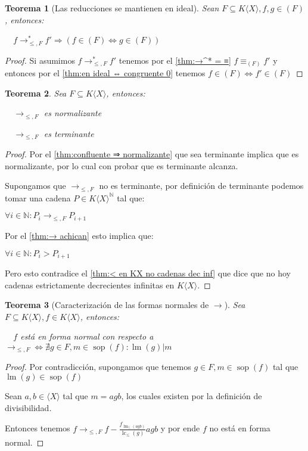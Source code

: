 \documentclass{amsbook}
\theoremstyle{customstyle}
\newtheorem{theorem}{Teorema}[section]
\DeclareMathOperator{\sop}{sop}
\DeclareMathOperator{\lm}{lm}
\DeclareMathOperator{\lc}{lc}
\begin{document}
\begin{theorem}[Las reducciones se mantienen en ideal]\label{thm:→ mantiene pertenencia a ideal}
Sean $F ⊆ K⟨X⟩, f, g ∈ (F)$, entonces:

  $f →^*_{≤, F} f' ⇒ (f ∈ (F) ⇔ g ∈ (F))$

\end{theorem}
\begin{proof}
Si asumimos $f →^*_{≤, F} f'$ tenemos por el \cref{thm:→^* = ≡} $f ≡_{(F)} f'$ y entonces por el \cref{thm:en ideal ⇔ congruente 0} tenemos $f ∈ (F) ⇔ f' ∈ (F)$
\end{proof}

\begin{theorem}
Sea $F ⊆ K⟨X⟩$, entonces:

  $→_{≤, F}$ es normalizante

  $→_{≤, F}$ es terminante
\end{theorem}
\begin{proof}
Por el \cref{thm:confluente ⇒ normalizante} que sea terminante implica que es normalizante, por lo cual con probar que es terminante alcanza.

Supongamos que $→_{≤, F}$ no es terminante, por definición de terminante podemos tomar una cadena $P ∈ K⟨X⟩^ℕ$ tal que:

$∀i ∈ ℕ : P_i →_{≤, F} P_{i+1}$

Por el \cref{thm:→ achican} esto implica que:

$∀i ∈ ℕ : P_i > P_{i+1}$

Pero esto contradice el \cref{thm:< en KX no cadenas dec inf} que dice que no hoy cadenas estrictamente decrecientes infinitas en $K⟨X⟩$.

\end{proof}

\begin{theorem}[Caracterización de las formas normales de $→$]
Sea $F ⊆ K⟨X⟩, f ∈ K⟨X⟩$, entonces:

  $f$ está en forma normal con respecto a $→_{≤, F} ⇔ ∄g ∈ F, m ∈ \sop(f) : \lm(g) | m$

\end{theorem}
\begin{proof}
Por contradicción, supongamos que tenemos $g ∈ F, m ∈ \sop(f)$ tal que $\lm(g) ∈ \sop(f)$

Sean $a, b ∈ ⟨X⟩$ tal que $m = agb$, los cuales existen por la definición de divisibilidad.

Entonces tenemos $f →_{≤, F} f - \frac{f_{\lm_≤(agb)}}{\lc_≤(g)}agb$ y por ende $f$ no está en forma normal.

\end{proof}
\end{document}
